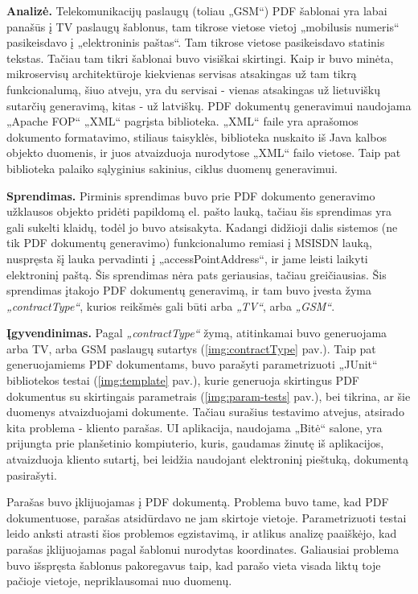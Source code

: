 \textbf{Analizė.} Telekomunikacijų paslaugų (toliau „GSM“) PDF šablonai yra labai panašūs į TV paslaugų šablonus, tam tikrose vietose vietoj „mobilusis numeris“ pasikeisdavo į
„elektroninis paštas“. Tam tikrose vietose pasikeisdavo statinis tekstas. Tačiau tam tikri šablonai buvo visiškai skirtingi.
Kaip ir buvo minėta, mikroservisų architektūroje kiekvienas servisas atsakingas už tam tikrą funkcionalumą, šiuo atveju, yra du servisai -
vienas atsakingas už lietuviškų sutarčių generavimą, kitas - už latviškų. PDF dokumentų generavimui naudojama „Apache FOP“ „XML“ pagrįsta biblioteka.
„XML“ faile yra aprašomos dokumento formatavimo, stiliaus taisyklės, biblioteka nuskaito iš Java kalbos objekto duomenis, ir juos atvaizduoja nurodytose „XML“ failo vietose.
Taip pat biblioteka palaiko sąlyginius sakinius, ciklus duomenų generavimui.

\textbf{Sprendimas.} Pirminis sprendimas buvo prie PDF dokumento generavimo užklausos objekto pridėti papildomą el. pašto lauką, tačiau šis sprendimas yra gali sukelti klaidų, todėl
jo buvo atsisakyta. Kadangi didžioji dalis sistemos (ne tik PDF dokumentų generavimo) funkcionalumo remiasi į MSISDN lauką, nuspręsta šį lauka pervadinti
į \textit{}„accessPointAddress“, ir jame leisti laikyti elektroninį paštą.
Šis sprendimas nėra pats geriausias, tačiau greičiausias. Šis sprendimas įtakojo PDF dokumentų generavimą, ir tam buvo įvesta žyma
\textit{„contractType“}, kurios reikšmės gali būti arba \textit{„TV“}, arba \textit{„GSM“}.

\textbf{Įgyvendinimas.} Pagal \textit{„contractType“} žymą, atitinkamai buvo generuojama arba TV, arba GSM paslaugų sutartys (\ref{img:contractType} pav.).
Taip pat generuojamiems PDF dokumentams, buvo parašyti parametrizuoti „JUnit“ bibliotekos testai (\ref{img:template} pav.), kurie generuoja skirtingus PDF dokumentus su
skirtingais parametrais (\ref{img:param-tests} pav.), bei tikrina, ar šie duomenys atvaizduojami dokumente.
Tačiau surašius testavimo atvejus, atsirado kita problema - kliento parašas. UI aplikacija, naudojama „Bitė“ salone,
yra prijungta prie planšetinio kompiuterio, kuris, gaudamas žinutę iš aplikacijos, atvaizduoja kliento sutartį, bei leidžia naudojant elektroninį pieštuką, dokumentą pasirašyti.

Parašas buvo įklijuojamas į PDF dokumentą. Problema buvo tame, kad PDF dokumentuose, parašas atsidūrdavo ne jam skirtoje vietoje.
Parametrizuoti testai leido anksti atrasti šios problemos egzistavimą, ir atlikus analizę paaiškėjo, kad parašas įklijuojamas pagal šablonui nurodytas koordinates.
Galiausiai problema buvo išspręsta šablonus pakoregavus taip, kad parašo vieta visada liktų toje pačioje vietoje, nepriklausomai nuo duomenų.

